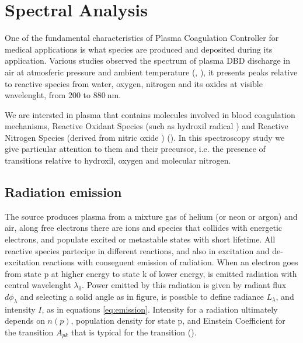 \chapter{Spectral Analysis}
\label{ch:spectrometry}
One of the fundamental characteristics of Plasma Coagulation Controller for medical applications is what species are produced and deposited during its application. Various studies observed the spectrum of plasma DBD discharge in air at atmosferic pressure and ambient temperature (\cite{DBDair_Trot}, \cite{DBDAirTypicalSpec}), it presents peaks relative to reactive species from water, oxygen, nitrogen and its oxides at visible wavelenght, from $\num{200}$ to $\SI{880}{\nano\meter}$.

We are intersted in plasma that contains molecules involved in blood coagulation mechanisms, Reactive Oxidant Species (such as hydroxil radical ) and Reactive Nitrogen Species (derived from nitric oxide ) (\cite{6153386}). In this spectroscopy study we give particular attention to them and their precursor, i.e. the presence of transitions relative to hydroxil, oxygen and molecular nitrogen.


\section{Radiation emission}
The source produces plasma from a mixture gas of helium (or neon or argon) and air, along free electrons there are ions and species that collides with energetic electrons, and populate excited or metastable states with short lifetime. All reactive species partecipe in different reactions, and also in excitation and de-excitation reactions with conseguent emission of radiation. When an electron goes from state p at higher energy to state k of lower energy, is emitted radiation with central wavelenght $\lambda_0$. Power emitted by this radiation is given by radiant flux $d\phi_{\lambda}$ and selecting a solid angle as in figure, is possible to define radiance $L_{\lambda}$, and intensity $I$, as in equations \ref{eq:emission}. Intensity for a radiation ultimately depends on $n(p)$, population density for state p, and Einstein Coefficient for the transition $A_{pk}$ that is typical for the transition (\cite{book:291477}).

